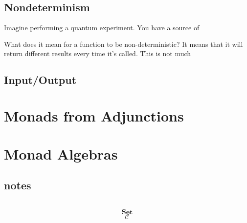 \documentclass[DaoFP]{subfiles}
\begin{document}
\subsection{Nondeterminism}

Imagine performing a quantum experiment. You have a source of 

What does it mean for a function to be non-deterministic? It means that it will return different results every time it's called. This is not much 

\subsection{Input/Output}

\section{Monads from Adjunctions}

\section{Monad Algebras}


\subsection{notes}


\begin{exercise}
\end{exercise}

\begin{haskell}
\end{haskell}

\[
 \begin{tikzcd}
  \end{tikzcd}
\]

\[   \mathbf{Set} \]
\[   \mathcal{C} \]
\end{document}
